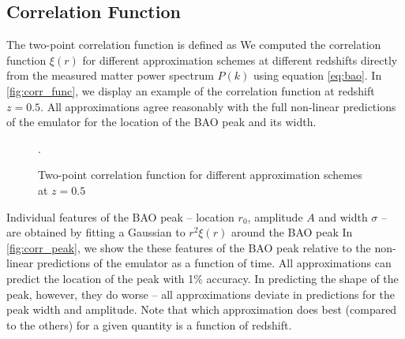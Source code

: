 \subsection{Correlation Function}
\label{sec:corr}
The two-point correlation function is defined as
We computed the correlation function $\xi(r)$ for different approximation schemes at different redshifts directly from the measured matter power spectrum $P(k)$ using equation \eqref{eq:bao}. In \autoref{fig:corr_func}, we display an example of the correlation function at redshift $z=0.5$. All approximations agree reasonably with the full non-linear predictions of the emulator for the location of the BAO peak and its width.
\begin{figure}
\centering
	\begin{subfigure}{\textwidth}
	\end{subfigure}
	\begin{subfigure}{\textwidth}
		\centering
	\end{subfigure}
	\caption{Two-point correlation function for different approximation schemes at $z=0.5$}.
	\label{fig:corr_func}
\end{figure}

Individual features of the BAO peak -- location $r_0$, amplitude $A$ and width $\sigma$ -- are obtained by fitting a Gaussian to $r^2\xi(r)$ around the BAO peak
In \autoref{fig:corr_peak}, we show the these features of the BAO peak relative to the non-linear predictions of the emulator as a function of time. All approximations can predict the location of the peak with 1\% accuracy. In predicting the shape of the peak, however, they do worse -- all approximations deviate in predictions for the peak width and amplitude. Note that which approximation does best (compared to the others) for a given quantity is a function of redshift.


